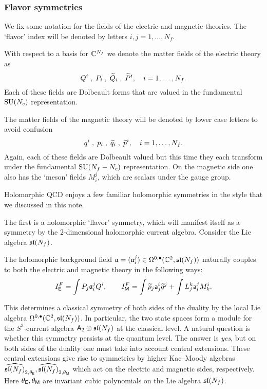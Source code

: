 \documentclass[11pt]{amsart}
\def\SU{{\rm SU}}
\def\sfa{\mathsf{a}}
\begin{document}
\subsubsection{Flavor symmetries}

We fix some notation for the fields of the electric and magnetic theories. 
The `flavor' index will be denoted by letters $i,j=1,\ldots, N_f$. 

With respect to a basis for $\CC^{N_f}$ we denote the matter fields of the electric theory as
\[
Q^i\; , \; P_i \; , \; \Tilde{Q}_i \; , \; \Tilde{P}^i , \quad i = 1, \ldots, N_f.
\]
Each of these fields are Dolbeault forms that are valued in the fundamental $\SU(N_c)$ representation. 

The matter fields of the magnetic theory will be denoted by lower case letters to avoid confusion
\[
q^i\; , \; p_i \; , \; \Tilde{q}_i \; , \; \Tilde{p}^i , \quad i = 1, \ldots, N_f.
\]
Again, each of these fields are Dolbeault valued but this time they each transform under the fundamental $\SU(N_f-N_c)$ representation. 
On the magnetic side one also has the `meson' fields $M_{i}^j$, which are scalars under the gauge group.

Holomorphic QCD enjoys a few familiar holomorphic symmetries in the style that we discussed in this note.

The first is a holomorphic `flavor' symmetry, which will manifest itself as a symmetry by the $2$-dimensional holomorphic current algebra. 
Consider the Lie algebra $\sl(N_f)$. 

The holomorphic background field $\fa = (\fa_i^j) \in \Omega^{0,\bu}(\CC^2 , \sl(N_f))$ naturally couples to both the electric and magnetic theory in the following ways:
\[
I^F_\sfE = \int P_j \fa_i^j Q^i , \qquad I^F_\sfM = \int \Tilde{p}_j \sfa_j^i \Tilde{q}^j + \int L^k_j \sfa_i^j M^i_k . 
\]

This determines a classical symmetry of both sides of the duality by the local Lie algebra $\Omega^{0,\bu}(\CC^2, \sl(N_f))$. 
In particular, the two state spaces form a module for the $S^3$-current algebra $\sfA_2 \otimes \sl(N_f)$ at the classical level.
A natural question is whether this symmetry persists at the quantum level. 
The answer is {\em yes}, but on both sides of the duality one must take into account central extensions.
These central extensions give rise to symmetries by higher Kac--Moody algebras $\Hat{\sl(N_f)}_{2,\theta_{\sfE}}, \Hat{\sl(N_f)}_{2,\theta_{\sfM}}$ which act on the electric and magnetic sides, respectively.
Here $\theta_\sfE, \theta_\sfM$ are invariant cubic polynomials on the Lie algebra $\sl(N_f)$. 
\end{document}
